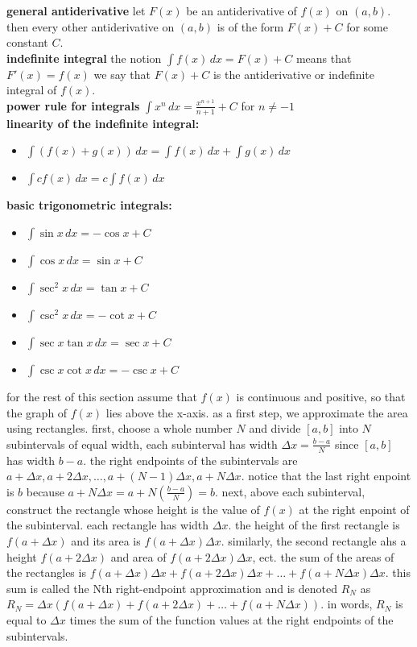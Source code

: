 \documentclass{article}
\begin{document}
\textbf{general antiderivative} let $F(x)$ be an antiderivative of $f(x)$ on $(a, b)$. then every other antiderivative on $(a, b)$ is of the form $F(x) + C$ for some constant $C$.\\

\textbf{indefinite integral} the notion $\int f(x)\,dx = F(x) + C$ means that $F'(x) = f(x)$ we say that $F(x) + C$ is the antiderivative or indefinite integral of $f(x)$.\\

\textbf{power rule for integrals} $\int x^n\,dx = \frac{x^{n + 1}}{n + 1} + C$ for $n \neq -1$\\ 

\textbf{linearity of the indefinite integral:}
	\begin{itemize}
		\item $\int (f(x) + g(x))\,dx = \int f(x)\,dx + \int g(x)\,dx$
		\item $\int cf(x)\,dx = c\int f(x)\,dx$
	\end{itemize}

\textbf{basic trigonometric integrals:}
	\begin{itemize}		
		\item $\int \sin x \,dx = -\cos x + C$
		\item $\int \cos x \,dx = \sin x + C$
		\item $\int \sec^2 x \,dx = \tan x + C$
		\item $\int \csc^2 x \,dx = -\cot x + C$
		\item $\int \sec x \tan x \,dx = \sec x + C$
		\item $\int \csc x \cot x \,dx = -\csc x + C$
	\end{itemize}

for the rest of this section assume that $f(x)$ is continuous and positive, so that the graph of $f(x)$ lies above the x-axis. as a first step, we approximate the area using rectangles. first, choose a whole number $N$ and divide $[a, b]$ into $N$ subintervals of equal width, each subinterval has width $\Delta x = \frac{b - a}{N}$ since $[a, b]$ has width $b - a$. the right endpoints of the subintervals are $a + \Delta x, a + 2\Delta x, \ldots, a + (N - 1)\Delta x, a + N\Delta x$. notice that the last right enpoint is $b$ because $a + N\Delta x = a + N(\frac{b - a}{N}) = b$. next, above each subinterval, construct the rectangle whose height is the value of $f(x)$ at the right enpoint of the subinterval. each rectangle has width $\Delta x$. the height of the first rectangle is $f(a + \Delta x)$ and its area is $f(a + \Delta x)\Delta x$. similarly, the second rectangle ahs a height $f(a + 2\Delta x)$ and area of $f(a + 2\Delta x)\Delta x$, ect. the sum of the areas of the rectangles is $f(a + \Delta x)\Delta x + f(a + 2\Delta x)\Delta x + \ldots + f(a + N\Delta x)\Delta x$. this sum is called the Nth right-endpoint approximation and is denoted $R_N$ as $R_N = \Delta x(f(a + \Delta x) + f(a + 2\Delta x) + \ldots + f(a + N\Delta x))$. in words, $R_N$ is equal to $\Delta x$ times the sum of the function values at the right endpoints of the subintervals.\\
\end{document}
